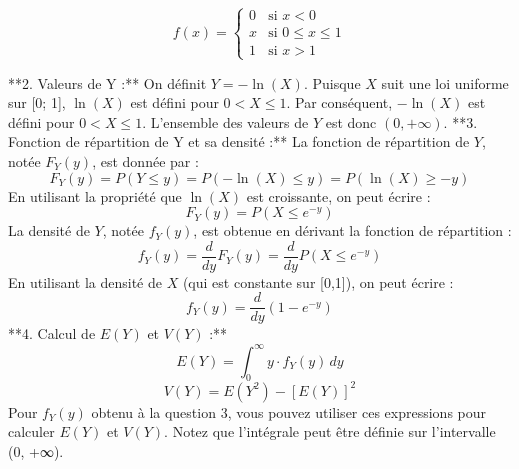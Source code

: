 \documentclass{article}
\begin{document}
\[
f(x) = \begin{cases}
0 & \text{si } x < 0 \\
x & \text{si } 0 \leq x \leq 1 \\
1 & \text{si } x > 1
\end{cases}
\]

**2. Valeurs de Y :**
On définit \( Y = -\ln(X) \). Puisque \( X \) suit une loi uniforme sur [0; 1], \( \ln(X) \) est défini pour \( 0 < X \leq 1 \). Par conséquent, \( -\ln(X) \) est défini pour \( 0 < X \leq 1 \).
L'ensemble des valeurs de \( Y \) est donc \( (0, +\infty) \).
**3. Fonction de répartition de Y et sa densité :**
La fonction de répartition de \( Y \), notée \( F_Y(y) \), est donnée par :
\[ F_Y(y) = P(Y \leq y) = P(-\ln(X) \leq y) = P(\ln(X) \geq -y) \]
En utilisant la propriété que \( \ln(X) \) est croissante, on peut écrire :
\[ F_Y(y) = P(X \leq e^{-y}) \]
La densité de \( Y \), notée \( f_Y(y) \), est obtenue en dérivant la fonction de répartition :
\[ f_Y(y) = \frac{d}{dy} F_Y(y) = \frac{d}{dy} P(X \leq e^{-y}) \]
En utilisant la densité de \( X \) (qui est constante sur [0,1]), on peut écrire :
\[ f_Y(y) = \frac{d}{dy} (1 - e^{-y}) \]
**4. Calcul de \(E(Y)\) et \(V(Y)\) :**
\[ E(Y) = \int_{0}^{\infty} y \cdot f_Y(y) \,dy \]
\[ V(Y) = E(Y^2) - [E(Y)]^2 \]
Pour \( f_Y(y) \) obtenu à la question 3, vous pouvez utiliser ces expressions pour calculer \(E(Y)\) et \(V(Y)\). Notez que l'intégrale peut être définie sur l'intervalle (0, +∞).
\end{document}
